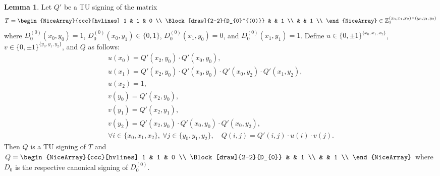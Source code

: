 \documentclass{article}
\theoremstyle{definition}
\newtheorem{lemma}[theorem]{Lemma}
\begin{document}
\begin{lemma}\label{lem:three_sum_canonical_resigning_helper}
    Let $Q'$ be a TU signing of the matrix
    \[
        T = \begin{NiceArray}{ccc}[hvlines]
            1 & 1 & 0 \\
            \Block[draw]{2-2}{D_{0}^{(0)}} & & 1 \\
             & & 1 \\
        \end{NiceArray} \in \mathbb{Z}_{2}^{(x_{0}, x_{1}, x_{2}) \times (y_{0}, y_{1}, y_{2})}
    \]
    where $D_{0}^{(0)} (x_{0}, y_{0}) = 1$, $D_{0}^{(0)} (x_{0}, y_{1}) \in \{0, 1\}$, $D_{0}^{(0)} (x_{1}, y_{0}) = 0$, and $D_{0}^{(0)} (x_{1}, y_{1}) = 1$. Define $u \in \{0, \pm 1\}^{\{x_{0}, x_{1}, x_{2}\}}$, $v \in \{0, \pm 1\}^{\{y_{0}, y_{1}, y_{2}\}}$, and $Q$ as follows:
    \begin{gather*}
        u(x_{0}) = Q' (x_{2}, y_{0}) \cdot Q' (x_{0}, y_{0}), \\
        u(x_{1}) = Q' (x_{2}, y_{0}) \cdot Q' (x_{0}, y_{0}) \cdot Q' (x_{0}, y_{2}) \cdot Q' (x_{1}, y_{2}), \\
        u(x_{2}) = 1, \\
        v(y_{0}) = Q' (x_{2}, y_{0}), \\
        v(y_{1}) = Q' (x_{2}, y_{1}), \\
        v(y_{2}) = Q' (x_{2}, y_{0}) \cdot Q' (x_{0}, y_{0}) \cdot Q' (x_{0}, y_{2}), \\
        \forall i \in \{x_{0}, x_{1}, x_{2}\}, \ \forall j \in \{y_{0}, y_{1}, y_{2}\}, \quad Q (i, j) = Q' (i, j) \cdot u(i) \cdot v(j).
    \end{gather*}
    Then $Q$ is a TU signing of $T$ and $Q = \begin{NiceArray}{ccc}[hvlines] 1 & 1 & 0 \\ \Block[draw]{2-2}{D_{0}} & & 1 \\ & & 1 \\ \end{NiceArray}$ where $D_{0}$ is the respective canonical signing of $D_{0}^{(0)}$.
\end{lemma}
\end{document}
